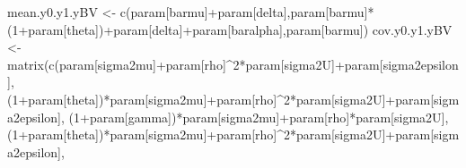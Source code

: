 \documentclass[
]{book}
\newenvironment{Shaded}{\begin{snugshade}}{\end{snugshade}}
\newcommand{\DecValTok}[1]{\textcolor[rgb]{0.00,0.00,0.81}{#1}}
\newcommand{\FunctionTok}[1]{\textcolor[rgb]{0.00,0.00,0.00}{#1}}
\newcommand{\NormalTok}[1]{#1}
\newcommand{\OtherTok}[1]{\textcolor[rgb]{0.56,0.35,0.01}{#1}}
\newcommand{\SpecialCharTok}[1]{\textcolor[rgb]{0.00,0.00,0.00}{#1}}
\newcommand{\StringTok}[1]{\textcolor[rgb]{0.31,0.60,0.02}{#1}}
\theoremstyle{definition}
\theoremstyle{definition}
\theoremstyle{definition}
\theoremstyle{definition}
\theoremstyle{remark}
\begin{document}
\begin{Shaded}
\begin{Highlighting}[]
\NormalTok{mean.y0.y1.yBV }\OtherTok{\textless{}{-}} \FunctionTok{c}\NormalTok{(param[}\StringTok{\textquotesingle{}barmu\textquotesingle{}}\NormalTok{]}\SpecialCharTok{+}\NormalTok{param[}\StringTok{\textquotesingle{}delta\textquotesingle{}}\NormalTok{],param[}\StringTok{\textquotesingle{}barmu\textquotesingle{}}\NormalTok{]}\SpecialCharTok{*}\NormalTok{(}\DecValTok{1}\SpecialCharTok{+}\NormalTok{param[}\StringTok{\textquotesingle{}theta\textquotesingle{}}\NormalTok{])}\SpecialCharTok{+}\NormalTok{param[}\StringTok{\textquotesingle{}delta\textquotesingle{}}\NormalTok{]}\SpecialCharTok{+}\NormalTok{param[}\StringTok{\textquotesingle{}baralpha\textquotesingle{}}\NormalTok{],param[}\StringTok{\textquotesingle{}barmu\textquotesingle{}}\NormalTok{])}
\NormalTok{cov.y0.y1.yBV }\OtherTok{\textless{}{-}} \FunctionTok{matrix}\NormalTok{(}\FunctionTok{c}\NormalTok{(param[}\StringTok{\textquotesingle{}sigma2mu\textquotesingle{}}\NormalTok{]}\SpecialCharTok{+}\NormalTok{param[}\StringTok{\textquotesingle{}rho\textquotesingle{}}\NormalTok{]}\SpecialCharTok{\^{}}\DecValTok{2}\SpecialCharTok{*}\NormalTok{param[}\StringTok{\textquotesingle{}sigma2U\textquotesingle{}}\NormalTok{]}\SpecialCharTok{+}\NormalTok{param[}\StringTok{\textquotesingle{}sigma2epsilon\textquotesingle{}}\NormalTok{],}
\NormalTok{                          (}\DecValTok{1}\SpecialCharTok{+}\NormalTok{param[}\StringTok{\textquotesingle{}theta\textquotesingle{}}\NormalTok{])}\SpecialCharTok{*}\NormalTok{param[}\StringTok{\textquotesingle{}sigma2mu\textquotesingle{}}\NormalTok{]}\SpecialCharTok{+}\NormalTok{param[}\StringTok{\textquotesingle{}rho\textquotesingle{}}\NormalTok{]}\SpecialCharTok{\^{}}\DecValTok{2}\SpecialCharTok{*}\NormalTok{param[}\StringTok{\textquotesingle{}sigma2U\textquotesingle{}}\NormalTok{]}\SpecialCharTok{+}\NormalTok{param[}\StringTok{\textquotesingle{}sigma2epsilon\textquotesingle{}}\NormalTok{],}
\NormalTok{                          (}\DecValTok{1}\SpecialCharTok{+}\NormalTok{param[}\StringTok{\textquotesingle{}gamma\textquotesingle{}}\NormalTok{])}\SpecialCharTok{*}\NormalTok{param[}\StringTok{\textquotesingle{}sigma2mu\textquotesingle{}}\NormalTok{]}\SpecialCharTok{+}\NormalTok{param[}\StringTok{\textquotesingle{}rho\textquotesingle{}}\NormalTok{]}\SpecialCharTok{*}\NormalTok{param[}\StringTok{\textquotesingle{}sigma2U\textquotesingle{}}\NormalTok{],}
\NormalTok{                          (}\DecValTok{1}\SpecialCharTok{+}\NormalTok{param[}\StringTok{\textquotesingle{}theta\textquotesingle{}}\NormalTok{])}\SpecialCharTok{*}\NormalTok{param[}\StringTok{\textquotesingle{}sigma2mu\textquotesingle{}}\NormalTok{]}\SpecialCharTok{+}\NormalTok{param[}\StringTok{\textquotesingle{}rho\textquotesingle{}}\NormalTok{]}\SpecialCharTok{\^{}}\DecValTok{2}\SpecialCharTok{*}\NormalTok{param[}\StringTok{\textquotesingle{}sigma2U\textquotesingle{}}\NormalTok{]}\SpecialCharTok{+}\NormalTok{param[}\StringTok{\textquotesingle{}sigma2epsilon\textquotesingle{}}\NormalTok{],}

\end{Highlighting}
\end{Shaded}
\end{document}
